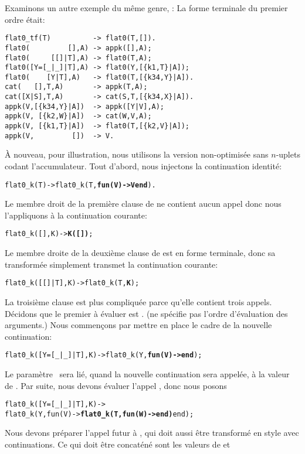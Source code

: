 Examinons un autre exemple du même genre, :
 La forme terminale du premier ordre était:
\begin{verbatim}
flat0_tf(T)          -> flat0(T,[]).
flat0(         [],A) -> appk([],A);
flat0(     [[]|T],A) -> flat0(T,A);
flat0([Y=[_|_]|T],A) -> flat0(Y,[{k1,T}|A]);
flat0(    [Y|T],A)   -> flat0(T,[{k34,Y}|A]).
cat(   [],T,A)       -> appk(T,A);
cat([X|S],T,A)       -> cat(S,T,[{k34,X}|A]).
appk(V,[{k34,Y}|A])  -> appk([Y|V],A);
appk(V, [{k2,W}|A])  -> cat(W,V,A);
appk(V, [{k1,T}|A])  -> flat0(T,[{k2,V}|A]);
appk(V,         [])  -> V.
\end{verbatim}
À nouveau, pour illustration, nous utilisons la version non-optimisée
sans \(n\)-uplets codant l'accumulateur. Tout d'abord, nous injectons
la continuation identité:
\begin{alltt}
flat0\_k(T) -> flat0\_k(T,\textbf{fun(V) -> V end}).
\end{alltt}
Le membre droit de la première clause de 
ne contient aucun appel donc nous l'appliquons à la continuation
courante:
\begin{alltt}
flat0\_k(         [],K) -> \textbf{K([])};
\end{alltt}
Le membre droite de la deuxième clause de  est en
forme terminale, donc sa transformée simplement transmet la
continuation courante:
\begin{alltt}
flat0\_k(     [[]|T],K) -> flat0\_k(T,\textbf{K});
\end{alltt}
La troisième clause est plus compliquée parce qu'elle contient trois
appels. Décidons que le premier à évaluer est
. (\Erlang ne spécifie pas l'ordre d'évaluation des
arguments.) Nous commençons par mettre en place le cadre de la
nouvelle continuation:
\begin{alltt}
flat0\_k([Y=[\_|\_]|T],K) -> flat0\_k(Y,\textbf{fun(V) ->  end});
\end{alltt}
Le paramètre~ sera lié, quand la nouvelle continuation sera
appelée, à la valeur de . Par suite, nous devons
évaluer l'appel , donc nous posons
\begin{alltt}
flat0\_k([Y=[\_|\_]|T],K) ->
  flat0\_k(Y,fun(V) -> \textbf{flat0\_k(T,fun(W) ->  end)} end);
\end{alltt}
Nous devons préparer l'appel futur à , qui doit aussi
être transformé en style avec continuations. Ce qui doit être
concaténé sont les valeurs de  et

